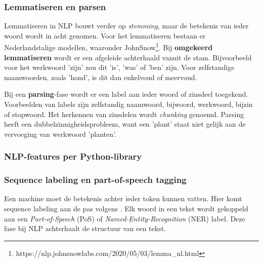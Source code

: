 \subsubsection{Lemmatiseren en parsen}

\begin{itemize}
Lemmatiseren in NLP bouwt verder op \textit{stemming}, maar de betekenis van ieder woord wordt in acht genomen. Voor het lemmatiseren bestaan er Nederlandstalige modellen, waaronder JohnSnow\footnote{https://nlp.johnsnowlabs.com/2020/05/03/lemma\_nl.html}. Bij \textbf{omgekeerd lemmatiseren} wordt er een afgeleide achterhaald vanuit de stam. Bijvoorbeeld voor het werkwoord 'zijn' zou dit 'is', 'was' of 'ben' zijn. Voor zelfstandige naamwoorden, zoals 'hond', is dit dan enkelvoud of meervoud.

Bij een \textbf{parsing}-fase wordt er een label aan ieder woord of zinsdeel toegekend. Voorbeelden van labels zijn zelfstandig naamwoord, bijwoord, werkwoord, bijzin of stopwoord. Het herkennen van zinsdelen wordt \textit{chunking} genoemd. Parsing heeft een dubbelzinnigheidsprobleem, want een 'plant' staat niet gelijk aan de vervoeging van werkwoord 'planten'.

\end{itemize}

\subsubsection{NLP-features per Python-library}


\subsubsection{Sequence labeling en part-of-speech tagging}

Een machine moet de betekenis achter ieder token kunnen vatten. Hier komt sequence labeling aan de pas volgens \textcite{Eisenstein2019}. Elk woord in een tekst wordt gekoppeld aan een \textit{Part-of-Speech} (PoS) of \textit{Named-Entity-Recognition} (NER) label. Deze fase bij NLP achterhaalt de structuur van een tekst. 

